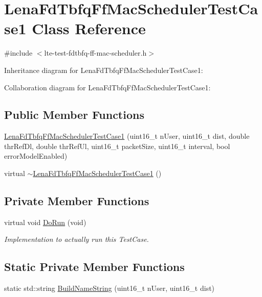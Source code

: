 \hypertarget{classLenaFdTbfqFfMacSchedulerTestCase1}{}\section{Lena\+Fd\+Tbfq\+Ff\+Mac\+Scheduler\+Test\+Case1 Class Reference}
\label{classLenaFdTbfqFfMacSchedulerTestCase1}


{\ttfamily \#include $<$lte-\/test-\/fdtbfq-\/ff-\/mac-\/scheduler.\+h$>$}



Inheritance diagram for Lena\+Fd\+Tbfq\+Ff\+Mac\+Scheduler\+Test\+Case1\+:


Collaboration diagram for Lena\+Fd\+Tbfq\+Ff\+Mac\+Scheduler\+Test\+Case1\+:
\subsection*{Public Member Functions}
\begin{DoxyCompactItemize}
\item 
\hyperlink{classLenaFdTbfqFfMacSchedulerTestCase1_a22ee1d092a030ce9e17e96145b5852c9}{Lena\+Fd\+Tbfq\+Ff\+Mac\+Scheduler\+Test\+Case1} (uint16\+\_\+t n\+User, uint16\+\_\+t dist, double thr\+Ref\+Dl, double thr\+Ref\+Ul, uint16\+\_\+t packet\+Size, uint16\+\_\+t interval, bool error\+Model\+Enabled)
\item 
virtual \hyperlink{classLenaFdTbfqFfMacSchedulerTestCase1_a51ae5a4b45bcc42141823d7eff46e941}{$\sim$\+Lena\+Fd\+Tbfq\+Ff\+Mac\+Scheduler\+Test\+Case1} ()
\end{DoxyCompactItemize}
\subsection*{Private Member Functions}
\begin{DoxyCompactItemize}
\item 
virtual void \hyperlink{classLenaFdTbfqFfMacSchedulerTestCase1_ae0536bf54d4e05fbf3600c1654c14cc0}{Do\+Run} (void)
\begin{DoxyCompactList}\small\item\em Implementation to actually run this Test\+Case. \end{DoxyCompactList}\end{DoxyCompactItemize}
\subsection*{Static Private Member Functions}
\begin{DoxyCompactItemize}
\item 
static std\+::string \hyperlink{classLenaFdTbfqFfMacSchedulerTestCase1_a680eb72a0bf4bf2000dda9825803a170}{Build\+Name\+String} (uint16\+\_\+t n\+User, uint16\+\_\+t dist)
\end{DoxyCompactItemize}
